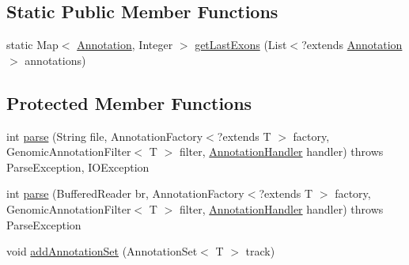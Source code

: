 \subsection*{Static Public Member Functions}
\begin{DoxyCompactItemize}
\item 
static Map$<$ \hyperlink{interfaceumms_1_1core_1_1annotation_1_1_annotation}{Annotation}, Integer $>$ \hyperlink{classbroad_1_1core_1_1annotation_1_1_annotation_reader_3_01_t_01extends_01_genomic_annotation_01_4_a8a0b54365f9d635929ad29cc80f42cdf}{get\+Last\+Exons} (List$<$?extends \hyperlink{interfaceumms_1_1core_1_1annotation_1_1_annotation}{Annotation} $>$ annotations)
\end{DoxyCompactItemize}
\subsection*{Protected Member Functions}
\begin{DoxyCompactItemize}
\item 
int \hyperlink{classbroad_1_1core_1_1annotation_1_1_annotation_reader_3_01_t_01extends_01_genomic_annotation_01_4_ac9109f4ca8125b8cbc526429897b8394}{parse} (String file, Annotation\+Factory$<$?extends T $>$ factory, Genomic\+Annotation\+Filter$<$ T $>$ filter, \hyperlink{interfacebroad_1_1core_1_1annotation_1_1_annotation_handler}{Annotation\+Handler} handler)  throws Parse\+Exception, I\+O\+Exception 
\item 
int \hyperlink{classbroad_1_1core_1_1annotation_1_1_annotation_reader_3_01_t_01extends_01_genomic_annotation_01_4_aca4e6cac48ba92a379000a7c7a086ee3}{parse} (Buffered\+Reader br, Annotation\+Factory$<$?extends T $>$ factory, Genomic\+Annotation\+Filter$<$ T $>$ filter, \hyperlink{interfacebroad_1_1core_1_1annotation_1_1_annotation_handler}{Annotation\+Handler} handler)  throws Parse\+Exception 
\item 
void \hyperlink{classbroad_1_1core_1_1annotation_1_1_annotation_reader_3_01_t_01extends_01_genomic_annotation_01_4_a89882e4ac854e619ff96b7af55eef8f3}{add\+Annotation\+Set} (Annotation\+Set$<$ T $>$ track)
\end{DoxyCompactItemize}


